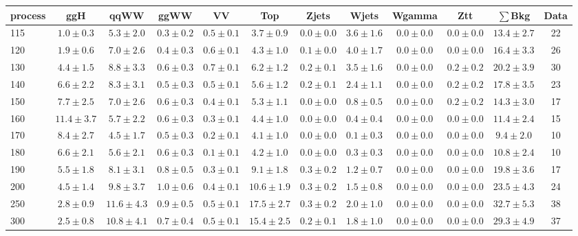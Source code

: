 \begin{table}
{\footnotesize
 \begin{center}
 \begin{tabular}{l c c c c c c c c c c c }
 \hline
 process & ggH & qqWW & ggWW & VV & Top & Zjets & Wjets & Wgamma & Ztt & $\sum$Bkg & Data \\
 \hline
115 & $1.0\pm0.3$ & $5.3\pm2.0$ & $0.3\pm0.2$ & $0.5\pm0.1$ & $3.7\pm0.9$ & $0.0\pm0.0$ & $3.6\pm1.6$ & $0.0\pm0.0$ & $0.0\pm0.0$ & $13.4\pm2.7$ & 22 \\
120 & $1.9\pm0.6$ & $7.0\pm2.6$ & $0.4\pm0.3$ & $0.6\pm0.1$ & $4.3\pm1.0$ & $0.1\pm0.0$ & $4.0\pm1.7$ & $0.0\pm0.0$ & $0.0\pm0.0$ & $16.4\pm3.3$ & 26 \\
130 & $4.4\pm1.5$ & $8.8\pm3.3$ & $0.6\pm0.3$ & $0.7\pm0.1$ & $6.2\pm1.2$ & $0.2\pm0.1$ & $3.5\pm1.6$ & $0.0\pm0.0$ & $0.2\pm0.2$ & $20.2\pm3.9$ & 30 \\
140 & $6.6\pm2.2$ & $8.3\pm3.1$ & $0.5\pm0.3$ & $0.5\pm0.1$ & $5.6\pm1.2$ & $0.2\pm0.1$ & $2.4\pm1.1$ & $0.0\pm0.0$ & $0.2\pm0.2$ & $17.8\pm3.5$ & 23 \\
150 & $7.7\pm2.5$ & $7.0\pm2.6$ & $0.6\pm0.3$ & $0.4\pm0.1$ & $5.3\pm1.1$ & $0.0\pm0.0$ & $0.8\pm0.5$ & $0.0\pm0.0$ & $0.2\pm0.2$ & $14.3\pm3.0$ & 17 \\
160 & $11.4\pm3.7$ & $5.7\pm2.2$ & $0.6\pm0.3$ & $0.3\pm0.1$ & $4.4\pm1.0$ & $0.0\pm0.0$ & $0.4\pm0.4$ & $0.0\pm0.0$ & $0.0\pm0.0$ & $11.4\pm2.4$ & 15 \\
170 & $8.4\pm2.7$ & $4.5\pm1.7$ & $0.5\pm0.3$ & $0.2\pm0.1$ & $4.1\pm1.0$ & $0.0\pm0.0$ & $0.1\pm0.3$ & $0.0\pm0.0$ & $0.0\pm0.0$ & $9.4\pm2.0$ & 10 \\
180 & $6.6\pm2.1$ & $5.6\pm2.1$ & $0.6\pm0.3$ & $0.1\pm0.1$ & $4.2\pm1.0$ & $0.0\pm0.0$ & $0.3\pm0.3$ & $0.0\pm0.0$ & $0.0\pm0.0$ & $10.8\pm2.4$ & 10 \\
190 & $5.5\pm1.8$ & $8.1\pm3.1$ & $0.8\pm0.5$ & $0.3\pm0.1$ & $9.1\pm1.8$ & $0.3\pm0.2$ & $1.2\pm0.7$ & $0.0\pm0.0$ & $0.0\pm0.0$ & $19.8\pm3.6$ & 17 \\
200 & $4.5\pm1.4$ & $9.8\pm3.7$ & $1.0\pm0.6$ & $0.4\pm0.1$ & $10.6\pm1.9$ & $0.3\pm0.2$ & $1.5\pm0.8$ & $0.0\pm0.0$ & $0.0\pm0.0$ & $23.5\pm4.3$ & 24 \\
250 & $2.8\pm0.9$ & $11.6\pm4.3$ & $0.9\pm0.5$ & $0.5\pm0.1$ & $17.5\pm2.7$ & $0.3\pm0.2$ & $2.0\pm1.0$ & $0.0\pm0.0$ & $0.0\pm0.0$ & $32.7\pm5.3$ & 38 \\
300 & $2.5\pm0.8$ & $10.8\pm4.1$ & $0.7\pm0.4$ & $0.5\pm0.1$ & $15.4\pm2.5$ & $0.2\pm0.1$ & $1.8\pm1.0$ & $0.0\pm0.0$ & $0.0\pm0.0$ & $29.3\pm4.9$ & 37 \\

\end{tabular}
\end{center}}
\end{table}
